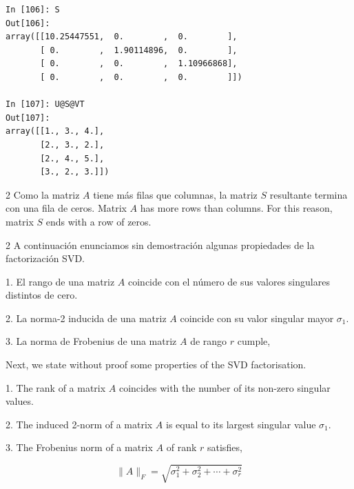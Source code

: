 \begin{center}
\begin{minipage}{0.7\textwidth}
\begin{verbatim}
In [106]: S
Out[106]: 
array([[10.25447551,  0.        ,  0.        ],
       [ 0.        ,  1.90114896,  0.        ],
       [ 0.        ,  0.        ,  1.10966868],
       [ 0.        ,  0.        ,  0.        ]])

In [107]: U@S@VT
Out[107]: 
array([[1., 3., 4.],
       [2., 3., 2.],
       [2., 4., 5.],
       [3., 2., 3.]])
\end{verbatim}
\end{minipage}
\end{center}

\begin{paracol}{2}
Como la matriz $A$ tiene más filas que columnas, la matriz $S$ resultante termina con una fila de ceros.
\switchcolumn
Matrix $A$ has more rows than columns. For this reason, matrix $S$ ends with a row of zeros. 
\end{paracol}

\begin{paracol}{2}
A continuación enunciamos sin demostración algunas propiedades de la factorización SVD.

1. El rango de una matriz $A$ coincide con el número de sus valores singulares distintos de cero.

2. La norma-2 inducida de una matriz $A$ coincide con su valor singular mayor $\sigma_1$.

3. La norma de Frobenius de una matriz $A$ de rango $r$ cumple,

\switchcolumn
Next, we state without proof some properties of the SVD factorisation.

1. The rank of a matrix $A$ coincides with the number of its non-zero singular values.

2. The induced 2-norm of a matrix $A$ is equal to its largest singular value $\sigma_1$.

3. The Frobenius norm of a matrix $A$ of rank $r$ satisfies,
\end{paracol}

\begin{equation*}
\lVert A \rVert_{F}=\sqrt{\sigma_1^2+\sigma_2^2+\cdots +\sigma_r^2}
\end{equation*}


